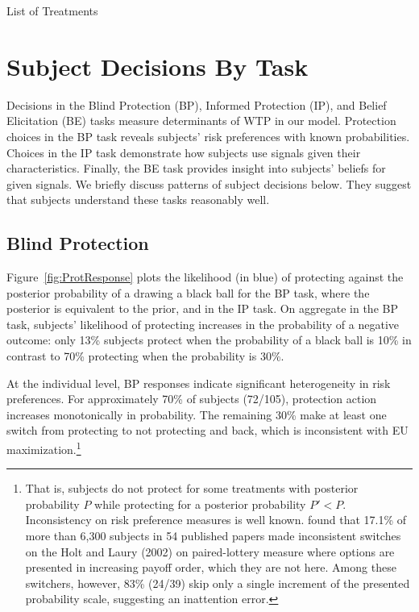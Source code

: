 \documentclass[12pt,a4paper]{article}
\begin{document}
\begin{table}[h!]
\caption{List of Treatments} \label{tab:treatments}

\end{table}


 


\vspace{20pt}
\section{Subject Decisions By Task}\label{sec:sanity}

Decisions in the Blind Protection (BP), Informed Protection (IP), and Belief Elicitation (BE) tasks measure determinants of WTP in our model. Protection choices in the BP task reveals subjects' risk preferences with known probabilities. Choices in the IP task demonstrate how subjects use signals given their characteristics. Finally, the BE task provides insight into subjects' beliefs for given signals.  We briefly discuss patterns of subject decisions below. They suggest that subjects understand these tasks reasonably well.

\subsection{Blind Protection}

Figure~\ref{fig:ProtResponse} plots the likelihood (in blue) of protecting against the posterior probability of a drawing a black ball for the BP task, where the posterior is equivalent to the prior, and in the IP task. On aggregate in the BP task, subjects' likelihood of protecting increases in the probability of a negative outcome: only 13\% subjects protect when the probability of a black ball is 10\% in contrast to 70\% protecting when the probability is 30\%. 

At the individual level, BP responses indicate significant heterogeneity in risk preferences. For approximately 70\% of subjects (72/105), protection action increases monotonically in probability. The remaining 30\% make at least one switch from protecting to not protecting and back, which is inconsistent with EU maximization.\footnote{That is, subjects do not protect for some treatments with posterior probability $P$ while protecting for a posterior probability $P'<P$.  Inconsistency on risk preference measures is well known.  \citet{filippin_reconsideration_2016} found that 17.1\% of more than 6,300 subjects in 54 published papers made inconsistent switches on the Holt and Laury (2002) on paired-lottery measure where options are presented in increasing payoff order, which they are not here. Among these switchers, however, 83\% (24/39) skip only a single increment of the presented probability scale, suggesting an inattention error.}
\end{document}
